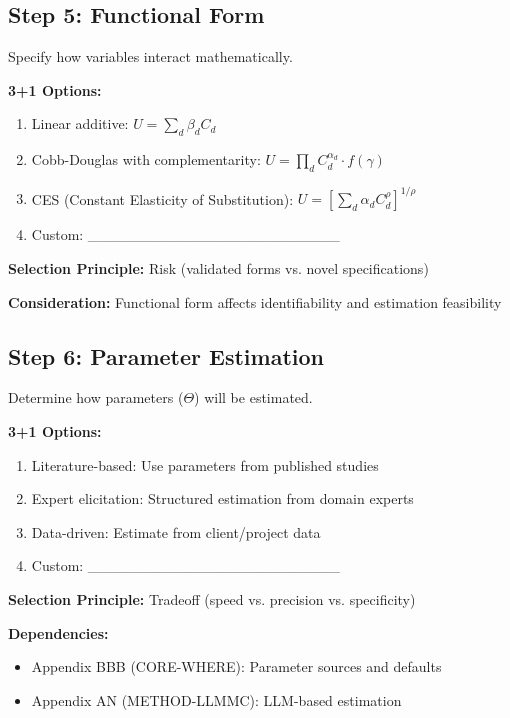 \subsection{Step 5: Functional Form}

Specify how variables interact mathematically.

\begin{tcolorbox}[colback=white, colframe=black,
    title=Step 5: Functional Form]
\textbf{3+1 Options:}
\begin{enumerate}
\item[$\square$] Linear additive: $U = \sum_d \beta_d C_d$
\item[$\square$] Cobb-Douglas with complementarity: $U = \prod_d C_d^{\alpha_d} \cdot f(\gamma)$
\item[$\square$] CES (Constant Elasticity of Substitution): $U = \left[\sum_d \alpha_d C_d^\rho\right]^{1/\rho}$
\item[$\square$] Custom: \_\_\_\_\_\_\_\_\_\_\_\_\_\_\_\_\_\_\_\_\_\_\_\_
\end{enumerate}

\textbf{Selection Principle:} Risk (validated forms vs. novel specifications)

\textbf{Consideration:} Functional form affects identifiability and estimation feasibility
\end{tcolorbox}

\subsection{Step 6: Parameter Estimation}

Determine how parameters ($\Theta$) will be estimated.

\begin{tcolorbox}[colback=white, colframe=black,
    title=Step 6: Parameter Estimation]
\textbf{3+1 Options:}
\begin{enumerate}
\item[$\square$] Literature-based: Use parameters from published studies
\item[$\square$] Expert elicitation: Structured estimation from domain experts
\item[$\square$] Data-driven: Estimate from client/project data
\item[$\square$] Custom: \_\_\_\_\_\_\_\_\_\_\_\_\_\_\_\_\_\_\_\_\_\_\_\_
\end{enumerate}

\textbf{Selection Principle:} Tradeoff (speed vs. precision vs. specificity)

\textbf{Dependencies:}
\begin{itemize}[nosep]
\item Appendix BBB (CORE-WHERE): Parameter sources and defaults
\item Appendix AN (METHOD-LLMMC): LLM-based estimation
\end{itemize}
\end{tcolorbox}

